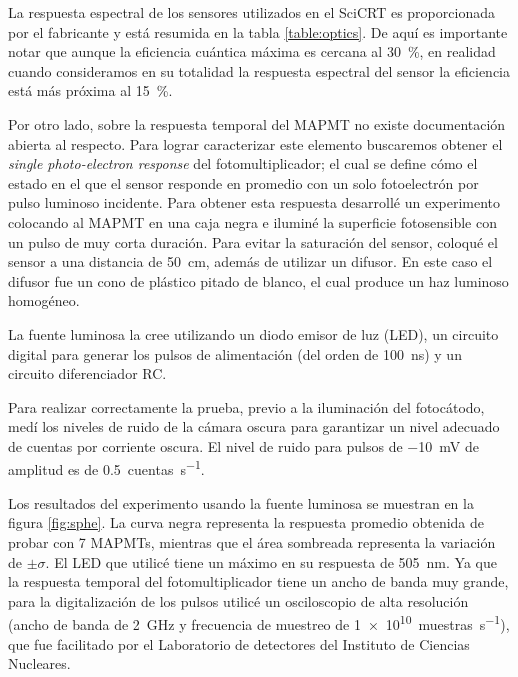 La respuesta espectral de los sensores utilizados en el SciCRT es proporcionada por el fabricante y está resumida en la tabla \ref{table:optics}. De aquí es importante notar que aunque la eficiencia cuántica máxima es cercana al \SI{30}{\percent}, en realidad cuando consideramos en su totalidad la respuesta espectral del sensor la eficiencia está más próxima al \SI{15}{\percent}.

Por otro lado, sobre la respuesta temporal del MAPMT no existe documentación abierta al respecto. Para lograr caracterizar este elemento buscaremos obtener el \emph{single photo-electron response} del fotomultiplicador; el cual se define cómo el estado en el que el sensor responde en promedio con un solo fotoelectrón por pulso luminoso incidente. Para obtener esta respuesta desarrollé un experimento colocando al MAPMT en una caja negra e iluminé la superficie fotosensible con un pulso de muy corta duración. Para evitar la saturación del sensor, coloqué el sensor a una distancia de \SI{50}{\cm}, además de utilizar un difusor. En este caso el difusor fue un cono de plástico pitado de blanco, el cual produce un haz luminoso homogéneo.

La fuente luminosa la cree utilizando un diodo emisor de luz (LED), un circuito digital para generar los pulsos de alimentación (del orden de \SI{100}{\nano\second}) y un circuito diferenciador RC.

Para realizar correctamente la prueba, previo a la iluminación del fotocátodo, medí los niveles de ruido de la cámara oscura para garantizar un nivel adecuado de cuentas por corriente oscura. El nivel de ruido para pulsos de \SI{-10}{\milli\volt} de amplitud es de \SI{0.5}{cuentas\per\second}.

Los resultados del experimento usando la fuente luminosa se muestran en la figura \ref{fig:sphe}. La curva negra representa la respuesta promedio obtenida de probar con \num{7} MAPMTs, mientras que el área sombreada representa la variación de $\pm\sigma$. El LED que utilicé tiene un máximo en su respuesta de \SI{505}{\nano\metre}. Ya que la respuesta temporal del fotomultiplicador tiene un ancho de banda muy grande, para la digitalización de los pulsos utilicé un osciloscopio de alta resolución  (ancho de banda de \SI{2}{\giga\hertz} y frecuencia de muestreo de \SI{1e10}{ muestras\per\second}), que fue facilitado por el Laboratorio de detectores del Instituto de Ciencias Nucleares.

